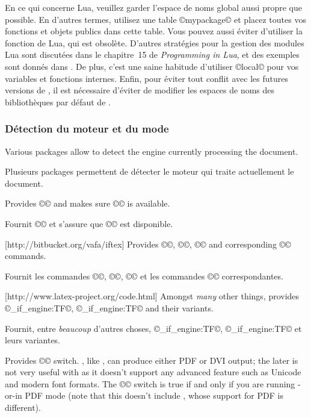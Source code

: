 \documentclass{lltxdoc}
\begin{document}
En ce qui concerne Lua, veuillez garder l'espace de noms global aussi propre que possible. En d'autres termes, utilisez une table ©mypackage© et placez toutes vos fonctions et objets publics dans cette table. Vous pouvez aussi éviter d'utiliser la fonction  de Lua, qui est obsolète. D'autres stratégies pour la gestion des modules Lua sont discutées dans le chapitre~15 de \emph{Programming in Lua}, et des exemples sont donnés dans . De plus, c'est une saine habitude d'utiliser ©local© pour vos variables et fonctions internes. Enfin, pour éviter tout conflit avec les futures versions de \luatex, il est nécessaire d'éviter de modifier les espaces de noms des bibliothèques par défaut de \luatex.

\subsubsection{Détection du moteur et du mode}\label{detect}

Various packages allow to detect the engine currently processing the document.

Plusieurs packages permettent de détecter le moteur qui traite actuellement le document.

Provides ©\ifluatex© and makes sure ©\luatexversion© is available.

Fournit ©\ifluatex© et s'assure que ©\luatexversion© est disponible.

[http://bitbucket.org/vafa/iftex]
Provides ©\ifPDFTeX©, ©\ifXeTeX©, ©\ifLuaTeX© and corresponding ©\Require©
commands.

Fournit les commandes ©\ifPDFTeX©, ©\ifXeTeX©, ©\ifLuaTeX© et les commandes ©\Require© correspondantes.

[http://www.latex-project.org/code.html]
Amongst \emph{many} other things, provides ©\luatex_if_engine:TF©,
©\xetex_if_engine:TF© and their variants.

Fournit, entre \emph{beaucoup} d'autres choses, ©\luatex_if_engine:TF©, ©\xetex_if_engine:TF© et leurs variantes.

Provides ©\ifpdf© switch. \luatex, like \pdftex, can produce either PDF or DVI
output; the later is not very useful with \luatex as it doesn't support any
advanced feature such as Unicode and modern font formats. The ©\ifpdf© switch
is true if and only if you are running \pdftex-or-\luatex in PDF mode (note
that this doesn't include \xetex, whose support for PDF is different).
\end{document}
